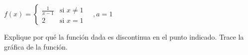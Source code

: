 \setcounter{enumi}{14}
\item $f(x) = \begin{cases} \frac{1}{x-1} & \text{si } x \neq 1 \\ 2 & \text{si } x = 1 \end{cases} \quad , a = 1$
\par
Explique por qué la función dada es discontinua en el punto indicado. Trace la gráfica de la función.
